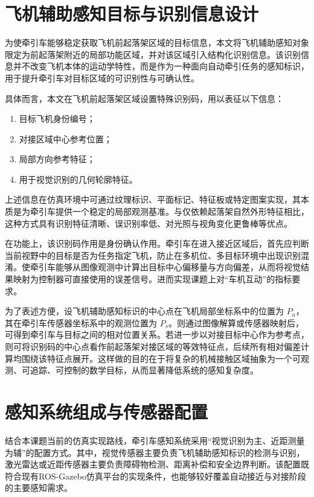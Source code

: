 \section{飞机辅助感知目标与识别信息设计}

为使牵引车能够稳定获取飞机前起落架区域的目标信息，本文将飞机辅助感知对象限定为前起落架附近的局部功能区域，并对该区域引入结构化识别信息。该识别信息并不改变飞机本体的运动学特性，而是作为一种面向自动牵引任务的感知标识，用于提升牵引车对目标区域的可识别性与可确认性。

具体而言，本文在飞机前起落架区域设置特殊识别码，用以表征以下信息：
\begin{enumerate}[label=（\arabic*）,leftmargin=2em]
\item 目标飞机身份编号；
\item 对接区域中心参考位置；
\item 局部方向参考特征；
\item 用于视觉识别的几何轮廓特征。
\end{enumerate}

上述信息在仿真环境中可通过纹理标识、平面标记、特征板或特定图案实现，其本质是为牵引车提供一个稳定的局部观测基准\cite{ref29,ref30}。与仅依赖起落架自然外形特征相比，这种方式具有识别特征清晰、误识别率低、对光照与视角变化更鲁棒等优点\cite{ref30}。

在功能上，该识别码作用是身份确认作用。牵引车在进入接近区域后，首先应判断当前视野中的目标是否为任务指定飞机，防止在多机位、多目标环境中出现识别混淆。使牵引车能够从图像观测中计算出目标中心偏移量与方向偏差，从而将视觉结果映射为控制器可直接使用的误差信号。进而实现课题上对``车机互动''的指标要求。

为了表述方便，设飞机辅助感知标识的中心点在飞机局部坐标系中的位置为
\(P_{a}\)，其在牵引车传感器坐标系中的观测位置为
\(P_{s}\)。则通过图像解算或传感器映射后，可得到牵引车与目标之间的相对位置关系。若进一步以对接目标中心作为参考点，则可将识别码的中心点看作前起落架对接区域的等效特征点，后续所有相对偏差计算均围绕该特征点展开。这样做的目的在于将复杂的机械接触区域抽象为一个可观测、可追踪、可控制的数学目标，从而显著降低系统的感知复杂度。

\section{感知系统组成与传感器配置}

结合本课题当前的仿真实现路线，牵引车感知系统采用``视觉识别为主、近距测量为辅''的配置方式。其中，视觉传感器主要负责飞机辅助感知标识的检测与识别，激光雷达或近距传感器主要负责障碍物检测、距离补偿和安全边界判断。该配置既符合现有ROS-Gazebo仿真平台的实现条件，也能够较好覆盖自动接近与对接阶段的主要感知需求。

